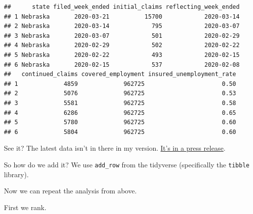 \documentclass[]{book}
\newenvironment{Shaded}{\begin{snugshade}}{\end{snugshade}}
\newcommand{\DataTypeTok}[1]{\textcolor[rgb]{0.13,0.29,0.53}{#1}}
\newcommand{\DecValTok}[1]{\textcolor[rgb]{0.00,0.00,0.81}{#1}}
\newcommand{\KeywordTok}[1]{\textcolor[rgb]{0.13,0.29,0.53}{\textbf{#1}}}
\newcommand{\NormalTok}[1]{#1}
\newcommand{\OperatorTok}[1]{\textcolor[rgb]{0.81,0.36,0.00}{\textbf{#1}}}
\newcommand{\StringTok}[1]{\textcolor[rgb]{0.31,0.60,0.02}{#1}}
\begin{document}
\begin{verbatim}
##      state filed_week_ended initial_claims reflecting_week_ended
## 1 Nebraska       2020-03-21          15700            2020-03-14
## 2 Nebraska       2020-03-14            795            2020-03-07
## 3 Nebraska       2020-03-07            501            2020-02-29
## 4 Nebraska       2020-02-29            502            2020-02-22
## 5 Nebraska       2020-02-22            493            2020-02-15
## 6 Nebraska       2020-02-15            537            2020-02-08
##   continued_claims covered_employment insured_unemployment_rate
## 1             4859             962725                      0.50
## 2             5076             962725                      0.53
## 3             5581             962725                      0.58
## 4             6286             962725                      0.65
## 5             5780             962725                      0.60
## 6             5804             962725                      0.60
\end{verbatim}

See it? The latest data isn't in there in my version. \href{https://www.dol.gov/sites/dolgov/files/OPA/newsreleases/ui-claims/20200551.pdf}{It's in a press release}.

So how do we add it? We use \texttt{add\_row} from the tidyverse (specifically the \texttt{tibble} library).

\begin{Shaded}
\end{Shaded}

Now we can repeat the analysis from above.

First we rank.

\begin{Shaded}
\end{Shaded}
\end{document}
